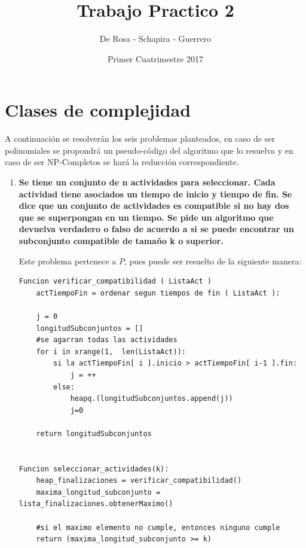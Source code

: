 \documentclass{article}
\title{Trabajo Practico 2}
\author{De Rosa - Schapira - Guerrero}
\date{Primer Cuatrimestre 2017}
\newcommand\tab[1][0.5cm]{\hspace*{#1}}
\begin{document}
    \maketitle
    \newpage
    \tableofcontents
    \newpage

    \section{Clases de complejidad}
    \tab A continuación se resolverán los seis problemas planteados, en caso de ser polinomiales se propondrá un
    pseudo-código del algoritmo que lo resuelva y en caso de ser NP-Completos se hará la reducción correspondiente.
    \begin{enumerate}
        \item \textbf{Se tiene un conjunto de n actividades para seleccionar. Cada actividad tiene asociados un tiempo de
            inicio y tiempo de fin. Se dice que un conjunto de actividades es compatible si no hay dos que se
            superpongan en un tiempo. Se pide un algoritmo que devuelva verdadero o falso de acuerdo a si se
            puede encontrar un subconjunto compatible de tamaño k o superior.} %

            \tab Este problema pertenece a $P$, pues puede ser resuelto de la siguiente manera: %

            \begin{lstlisting}
Funcion verificar_compatibilidad ( ListaAct )
    actTiempoFin = ordenar segun tiempos de fin ( ListaAct ):

    j = 0
    longitudSubconjuntos = []
    #se agarran todas las actividades
    for i in xrange(1,  len(ListaAct)):
        si la actTiempoFin[ i ].inicio > actTiempoFin[ i-1 ].fin:
            j = ++
        else:
            heapq.(longitudSubconjuntos.append(j))
            j=0

    return longitudSubconjuntos


Funcion seleccionar_actividades(k):
    heap_finalizaciones = verificar_compatibilidad()
    maxima_longitud_subconjunto = lista_finalizaciones.obtenerMaximo()

    #si el maximo elemento no cumple, entonces ninguno cumple
    return (maxima_longitud_subconjunto >= k)
            \end{lstlisting}



\end{enumerate}
\end{document}
